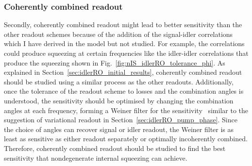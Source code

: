
\subsubsection{Coherently combined readout}

Secondly, coherently combined readout might lead to better sensitivity than the other readout schemes because of the addition of the signal-idler correlations which I have derived in the model but not studied. For example, the correlations could produce squeezing at certain frequencies like the idler-idler correlations that produce the squeezing shown in Fig.~\ref{fig:nIS_idlerRO_tolerance_phi}. As explained in Section~\ref{sec:idlerRO_initial_results}, coherently combined readout should be studied using a similar process as the other readouts. Additionally, once the tolerance of the readout scheme to losses and the combination angles is understood, the sensitivity should be optimised by changing the combination angles at each frequency, forming a Weiner filter for the sensitivity~\cite{} similar to the suggestion of variational readout in Section~\ref{sec:idlerRO_pump_phase}. Since the choice of angles can recover signal or idler readout, the Weiner filter is as least as sensitive as either readout separately or optimally incoherently combined. %
Therefore, coherently combined readout should be studied to find the best sensitivity that nondegenerate internal squeezing can achieve.


